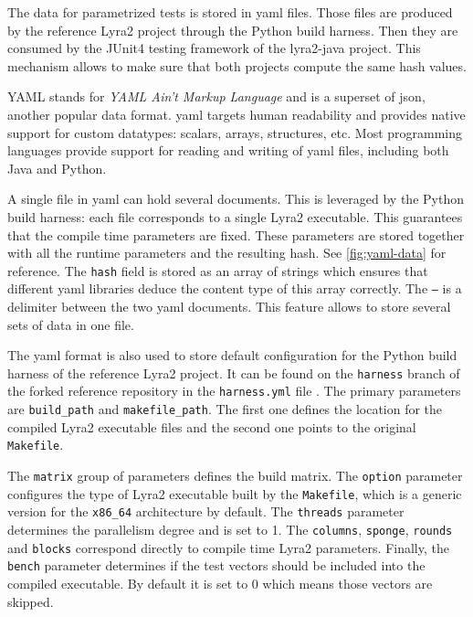 The data for parametrized tests is stored in \gls{yaml} files. Those files are produced by the reference Lyra2 project through the Python build harness. Then they are consumed by the JUnit4 testing framework of the lyra2-java project. This mechanism allows to make sure that both projects compute the same hash values.

YAML stands for \emph{YAML Ain't Markup Language} and is a superset of \gls{json}, another popular data format. \gls{yaml} targets human readability and provides native support for custom datatypes: scalars, arrays, structures, etc. Most programming languages provide support for reading and writing of \gls{yaml} files, including both Java and Python.

A single file in \gls{yaml} can hold several documents. This is leveraged by the Python build harness: each file corresponds to a single Lyra2 executable. This guarantees that the compile time parameters are fixed. These parameters are stored together with all the runtime parameters and the resulting hash. See \autoref{fig:yaml-data} for reference. The \texttt{hash} field is stored as an array of strings which ensures that different \gls{yaml} libraries deduce the content type of this array correctly. The \texttt{---} is a delimiter between the two \gls{yaml} documents. This feature allows to store several sets of data in one file.

The \gls{yaml} format is also used to store default configuration for the Python build harness of the reference Lyra2 project. It can be found on the \texttt{harness} branch of the forked reference repository in the \texttt{harness.yml} file \cite{github:2017:lyra-copy}. The primary parameters are \texttt{build\_path} and \texttt{makefile\_path}. The first one defines the location for the compiled Lyra2 executable files and the second one points to the original \texttt{Makefile}.

The \texttt{matrix} group of parameters defines the build matrix. The \texttt{option} parameter configures the type of Lyra2 executable built by the \texttt{Makefile}, which is a generic version for the \texttt{x86\_64} architecture by default. The \texttt{threads} parameter determines the parallelism degree and is set to 1. The \texttt{columns}, \texttt{sponge}, \texttt{rounds} and \texttt{blocks} correspond directly to compile time Lyra2 parameters. Finally, the \texttt{bench} parameter determines if the test vectors should be included into the compiled executable. By default it is set to 0 which means those vectors are skipped.

